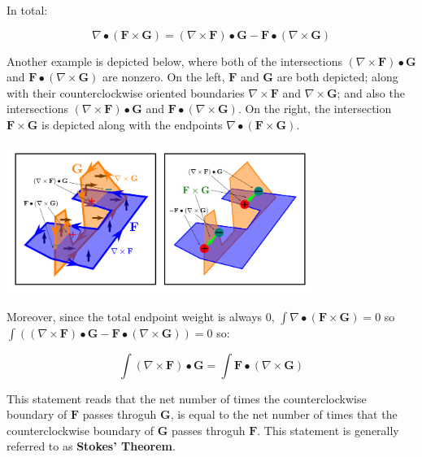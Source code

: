 In total:
\begin{thm}
\[\nabla \bullet (\mathbf{F} \times \mathbf{G}) = (\nabla \times \mathbf{F}) \bullet \mathbf{G} - \mathbf{F} \bullet (\nabla \times \mathbf{G})\]
\end{thm}

Another example is depicted below, where both of the intersections \((\nabla \times \mathbf{F}) \bullet \mathbf{G}\) and \(\mathbf{F} \bullet (\nabla \times \mathbf{G})\) are nonzero. On the left, \(\mathbf{F}\) and \(\mathbf{G}\) are both depicted; along with their counterclockwise oriented boundaries \(\nabla \times \mathbf{F}\) and \(\nabla \times \mathbf{G}\); and also the intersections \((\nabla \times \mathbf{F}) \bullet \mathbf{G}\) and \(\mathbf{F} \bullet (\nabla \times \mathbf{G})\). On the right, the intersection \(\mathbf{F} \times \mathbf{G}\) is depicted along with the endpoints \(\nabla \bullet (\mathbf{F} \times \mathbf{G})\).

\begin{center}
\includegraphics[width = 0.75\textwidth]{Boundaries/Path_endpoints/surface_surface_intersection_endpoints}
\end{center}

Moreover, since the total endpoint weight is always \(0\), \(\int \nabla \bullet (\mathbf{F} \times \mathbf{G}) = 0\) so \(\int ((\nabla \times \mathbf{F}) \bullet \mathbf{G} - \mathbf{F} \bullet (\nabla \times \mathbf{G})) = 0\) so:

\begin{thm}
\[\int (\nabla \times \mathbf{F}) \bullet \mathbf{G} = \int \mathbf{F} \bullet (\nabla \times \mathbf{G})\]
\end{thm}

This statement reads that the net number of times the counterclockwise boundary of \(\mathbf{F}\) passes throguh \(\mathbf{G}\), is equal to the net number of times that the counterclockwise boundary of \(\mathbf{G}\) passes throguh \(\mathbf{F}\). This statement is generally referred to as {\bf Stokes' Theorem}.

